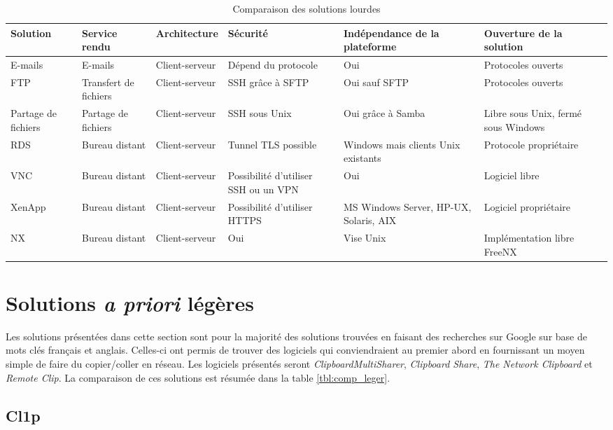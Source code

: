 \begin{sidewaystable}[!h]
  \centering
  \begin{tabular}{|l|l|l|m{7em}|m{7em}|m{7em}|}
    \hline
    Solution & Service rendu & Architecture & Sécurité & In\-dé\-pen\-dance
    de la plateforme & Ouverture de la solution \\
    \hline
    \hline
    E-mails & E-mails & Client-serveur & Dépend du protocole & Oui &
    Protocoles ouverts \\
    \hline
    FTP & Transfert de fichiers & Client-serveur & SSH grâce à SFTP & Oui
    sauf SFTP & Protocoles ouverts \\
    \hline
    Partage de fichiers & Partage de fichiers & Client-serveur & SSH sous
    Unix & Oui grâce à Samba & Libre sous Unix, fermé sous Windows \\
    \hline
    RDS & Bureau distant & Client-serveur & Tunnel TLS possible & Windows
    mais clients Unix existants & Protocole propriétaire\\
    \hline
    VNC & Bureau distant & Client-serveur & Possibilité d'utiliser SSH ou un
    VPN & Oui & Logiciel libre \\
    \hline
    XenApp & Bureau distant & Client-serveur & Possibilité d'utiliser HTTPS &
    MS Windows Server, HP-UX, Solaris, AIX & Logiciel propriétaire \\
    \hline
    NX & Bureau distant & Client-serveur & Oui & Vise Unix &
    Im\-plé\-men\-ta\-tion libre FreeNX \\
    \hline
  \end{tabular}
  \caption{\label{tbl:comp_lourd} Comparaison des solutions lourdes}
\end{sidewaystable}

\section{Solutions \emph{a priori} légères}
Les solutions présentées dans cette section sont pour la majorité des
solutions trouvées en faisant des recherches sur Google sur base
de mots clés français et anglais. Celles-ci ont permis de trouver des
logiciels qui conviendraient au premier abord en fournissant un moyen
simple de faire du copier/coller en réseau. Les logiciels présentés seront
\emph{ClipboardMultiSharer}, \emph{Clipboard Share},
\emph{The Network Clipboard} et \emph{Remote Clip}.
La comparaison de ces solutions est résumée dans la table \ref{tbl:comp_leger}.

\subsection{Cl1p}

